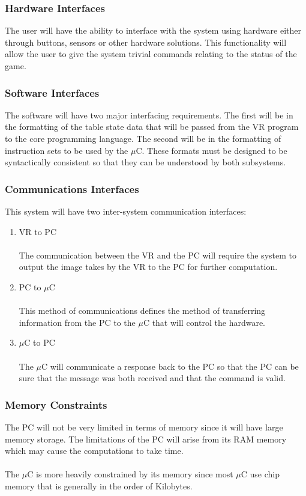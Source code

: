 \documentclass[titlepage]{article}
\begin{document}
\subsubsection{Hardware Interfaces}
The user will have the ability to interface with the system using hardware either through buttons, sensors or other hardware solutions. This functionality will allow the user to give the system trivial commands relating to the status of the game.
\subsubsection{Software Interfaces}
The software will have two major interfacing requirements. The first will be in the formatting of the table state data that will be passed from the VR program to the core programming language. The second will be in the formatting of instruction sets to be used by the $\mu$C. These formats must be designed to be syntactically consistent so that they can be understood by both subsystems.
\subsubsection{Communications Interfaces}
This system will have two inter-system communication interfaces:
\begin{enumerate}
	\item VR to PC\\\\
	The communication between the VR and the PC will require the system to output the image takes by the VR to the PC for further computation.
	\item PC to $\mu$C\\\\
	This method of communications defines the method of transferring information from the PC to the $\mu$C that will control the hardware.
	\item $\mu$C to PC\\\\
	The $\mu$C will communicate a response back to the PC so that the PC can be sure that the message was both received and that the command is valid.
\end{enumerate}
\subsubsection{Memory Constraints}
The PC will not be very limited in terms of memory since it will have large memory storage. The limitations of the PC will arise from its RAM memory which may cause the computations to take time.\\\\
The $\mu$C is more heavily constrained by its memory since most $\mu$C use chip memory that is generally in the order of Kilobytes.
\end{document}
